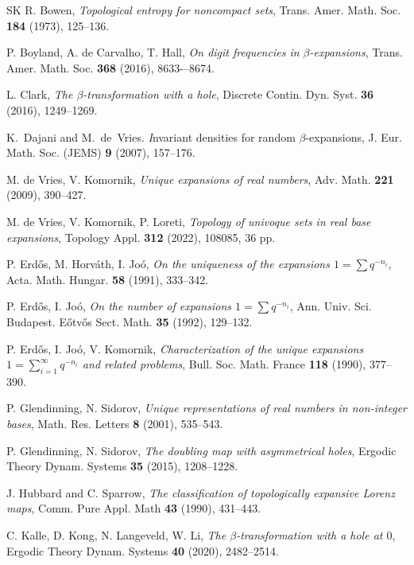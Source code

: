 \documentclass{amsart}
\theoremstyle{definition}
\numberwithin{equation}{section}
\begin{document}
\begin{thebibliography}{SK}
R. Bowen,
\emph{Topological entropy for noncompact sets},
Trans. Amer. Math. Soc. {\bf 184} (1973), 125--136.

P. Boyland, A. de Carvalho, T. Hall,
\emph{On digit frequencies in $\beta$-expansions},
Trans. Amer. Math. Soc. {\bf 368} (2016), 8633-–8674.

L. Clark, \emph{The $\beta$-transformation with a hole}, Discrete Contin. Dyn. Syst. {\bf36} (2016), 1249--1269.

K.~Dajani and M.~de~Vries.
{\emph Invariant densities for random {$\beta$}-expansions},
 J. Eur. Math. Soc. (JEMS) {\bf 9} (2007), 157--176.

M. de Vries,  V. Komornik,
\emph{Unique expansions of real numbers},
Adv.  Math. {\bf 221} (2009), 390--427.

M. de Vries,  V. Komornik,  P. Loreti,
\emph{Topology of univoque sets in real base expansions},
Topology Appl. {\bf 312} (2022), 108085, 36 pp.

P. Erd\H{o}s, M. Horv\'{a}th,  I. Jo\'{o},
\emph{On the uniqueness of the expansions $1=\sum q^{-n_i}$},
Acta. Math. Hungar. {\bf 58} (1991), 333--342.

P. Erd\H{o}s,  I. Jo\'{o},
\emph{On the number of expansions $1=\sum q^{-n_i}$},
Ann. Univ. Sci. Budapest. E\H{o}tv\H{o}s Sect. Math. {\bf 35} (1992), 129--132.

P. Erd\H{o}s,  I. Jo\'{o},  V. Komornik,
\emph{Characterization of the unique expansions $1=\sum_{i=1}^\infty q^{-n_i}$ and related problems},
Bull. Soc.  Math. France {\bf 118} (1990), 377--390.

P. Glendinning, N. Sidorov,
\emph{Unique representations of real numbers in non-integer bases},
Math. Res. Letters {\bf 8} (2001), 535--543.

P. Glendinning, N. Sidorov, 
\emph{The doubling map with asymmetrical holes}, 
Ergodic Theory Dynam. Systems {\bf 35} (2015), 1208--1228.

J. Hubbard and C. Sparrow, \emph{ The classification of topologically expansive Lorenz maps}, Comm. Pure Appl.
Math  {\bf 43} (1990), 431--443.

 C. Kalle, D. Kong, N. Langeveld,  W. Li, 
\emph{The $\beta$-transformation with a hole at $0$}, 
Ergodic Theory Dynam. Systems {\bf 40} (2020), 2482--2514.


\end{thebibliography}
\end{document}
